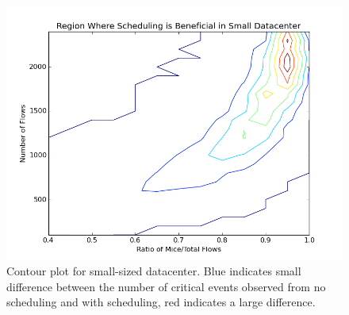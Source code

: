 \begin{figure}[H]
	\centering
	\includegraphics[width=\columnwidth]{small_datacenter.png}
	\caption{Contour plot for small-sized datacenter. Blue indicates small
    difference between the number of critical events observed from no
    scheduling and with scheduling, red indicates a large difference.}
	\label{fig:smalldc}
\end{figure}

